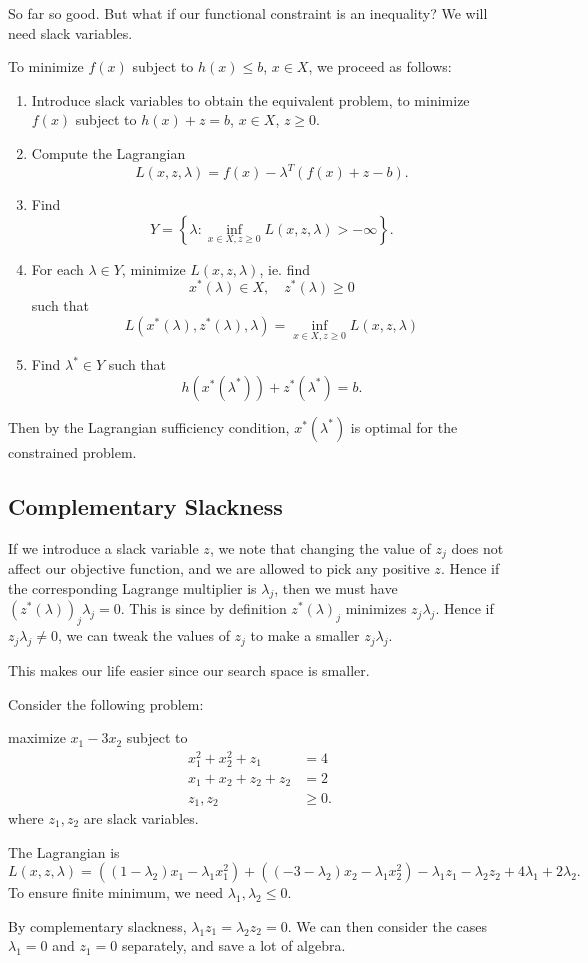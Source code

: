 \documentclass[a4paper]{article}
\begin{document}
So far so good. But what if our functional constraint is an inequality? We will need slack variables.

To minimize $f(x)$ subject to $h(x) \leq b$, $x\in X$, we proceed as follows:
\begin{enumerate}
  \item Introduce slack variables to obtain the equivalent problem, to minimize $f(x)$ subject to $h(x) + z = b$, $x \in X$, $z \geq 0$.
  \item Compute the Lagrangian
    \[
      L(x, z, \lambda) = f(x) - \lambda^T(f(x) + z - b).
    \]
  \item Find
    \[
      Y = \left\{\lambda: \inf_{x\in X, z\geq 0}L(x, z, \lambda) > -\infty\right\}.
    \]
  \item For each $\lambda\in Y$, minimize $L(x, z, \lambda)$, ie. find
    \[
      x^*(\lambda)\in X,\quad z^*(\lambda) \geq 0
    \]
    such that
    \[
      L(x^*(\lambda), z^*(\lambda), \lambda) = \inf_{x\in X, z\geq 0} L(x, z, \lambda)
    \]
  \item Find $\lambda^*\in Y$ such that
    \[
      h(x^*(\lambda^*)) + z^*(\lambda^*) = b.
    \]
\end{enumerate}
Then by the Lagrangian sufficiency condition, $x^*(\lambda^*)$ is optimal for the constrained problem.

\subsection{Complementary Slackness}
If we introduce a slack variable $z$, we note that changing the value of $z_j$ does not affect our objective function, and we are allowed to pick any positive $z$. Hence if the corresponding Lagrange multiplier is $\lambda_j$, then we must have $(z^*(\lambda))_j \lambda_j = 0$. This is since by definition $z^*(\lambda)_j$ minimizes $z_j \lambda_j$. Hence if $z_j \lambda_j \not= 0$, we can tweak the values of $z_j$ to make a smaller $z_j \lambda_j$.

This makes our life easier since our search space is smaller.

\begin{eg}
  Consider the following problem:
  \begin{center}
    maximize $x_1 - 3x_2$ subject to
    \begin{align*}
      x_1^2 + x_2^2 + z_1 &= 4\\
      x_1 + x_2 + z_2 + z_2 &= 2\\
      z_1, z_2 &\geq 0.
    \end{align*}
  where $z_1, z_2$ are slack variables.
  \end{center}
  The Lagrangian is
  \[
    L(x, z, \lambda) = ((1 - \lambda_2)x_1 - \lambda_1 x_1^2) + ((-3 - \lambda_2)x_2 - \lambda_1 x_2^2) - \lambda_1 z_1 - \lambda_2 z_2 + 4\lambda_1 + 2\lambda_2.
  \]
  To ensure finite minimum, we need $\lambda_1, \lambda_2 \leq 0$.

  By complementary slackness, $\lambda_1 z_1 = \lambda_2 z_2 = 0$. We can then consider the cases $\lambda_1 = 0$ and $z_1 = 0$ separately, and save a lot of algebra.
\end{eg}
\end{document}
